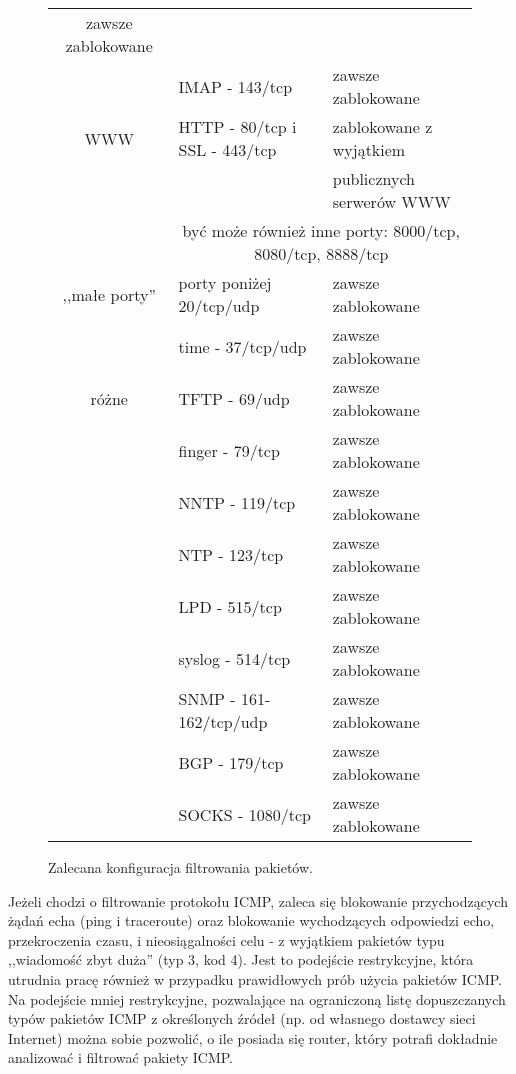 \begin{figure*}
\begin{small}
\begin{center}
\begin{tabular}{|c|l|l|}
    zawsze zablokowane\\ \cline{2 - 3}
 & IMAP - 143/tcp  &
    zawsze zablokowane\\ \hline
\hline
WWW & HTTP - 80/tcp i SSL - 443/tcp &
    zablokowane z wyjątkiem \\
 & & publicznych serwerów WWW \\ \cline{2 - 3}
 & \multicolumn{2}{c|}{być może również inne porty: 8000/tcp, 8080/tcp,
8888/tcp}\\ \hline
\hline
,,małe porty'' & porty poniżej 20/tcp/udp  &
    zawsze zablokowane\\ \cline{2 - 3}
 & time - 37/tcp/udp  &
    zawsze zablokowane\\ \hline
\hline
różne & TFTP - 69/udp  &
    zawsze zablokowane\\ \cline{2 - 3}
 & finger - 79/tcp  &
    zawsze zablokowane\\ \cline{2 - 3}
 & NNTP - 119/tcp  &
    zawsze zablokowane\\ \cline{2 - 3}
 & NTP - 123/tcp  &
    zawsze zablokowane\\ \cline{2 - 3}
 & LPD - 515/tcp  &
    zawsze zablokowane\\ \cline{2 - 3}
 & syslog - 514/tcp  &
    zawsze zablokowane\\ \cline{2 - 3}
 & SNMP - 161-162/tcp/udp  &
    zawsze zablokowane\\ \cline{2 - 3}
 & BGP - 179/tcp  &
    zawsze zablokowane\\ \cline{2 - 3}
 & SOCKS - 1080/tcp  &
    zawsze zablokowane\\ \hline
\end{tabular}
\end{center}
\end{small}
\caption[Zalecana konfiguracja filtrowania pakietów]
{\label{tab:frules} Zalecana konfiguracja filtrowania pakietów.}
\end{figure*}

Jeżeli chodzi o filtrowanie protokołu ICMP, zaleca się blokowanie
przychodzących żądań echa (ping i traceroute) oraz blokowanie wychodzących
odpowiedzi echo, przekroczenia czasu, i nieosiągalności celu - z wyjątkiem
pakietów typu ,,wiadomość zbyt duża'' (typ 3, kod 4). Jest to podejście
restrykcyjne, która utrudnia pracę również w przypadku prawidłowych prób
użycia pakietów ICMP. Na podejście mniej restrykcyjne, pozwalające na
ograniczoną listę dopuszczanych typów pakietów ICMP z określonych źródeł
(np. od własnego dostawcy sieci Internet) można sobie pozwolić, o ile
posiada się router, który potrafi dokładnie analizować i filtrować pakiety
ICMP.

